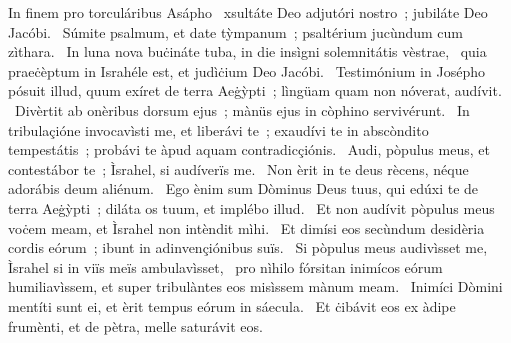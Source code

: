 { In finem pro torculáribus Asápho}
{%
~xsultáte Deo adjutóri nostro~; jubiláte Deo Jacóbi. 
~Súmite psalmum, et date tỳmpanum~; psaltérium jucùndum cum zìthara. 
~In luna nova buċináte tuba, in die insìgni solemnitátis vèstrae, 
~quia praeċèptum in Israhéle est, et judìċium Deo Jacóbi. 
~Testimónium in Josépho pósuit illud, quum exíret de terra Aeġỳpti~; lìngüam quam non nóverat, audívit. 
~Divèrtit ab onèribus dorsum ejus~; mànüs ejus in còphino servivérunt. 
~In tribulaçióne invocavìsti me, et liberávi te~; exaudívi te in abscòndito tempestátis~; probávi te àpud aquam contradicçiónis. 
~Audi, pòpulus meus, et contestábor te~; Ìsrahel, si audíverïs me. 
~Non èrit in te deus rècens, néque adorábis deum aliénum. 
~Ego ènim sum Dòminus Deus tuus, qui edúxi te de terra Aeġỳpti~; diláta os tuum, et implébo illud. 
~Et non audívit pòpulus meus voċem meam, et Ìsrahel non intèndit mìhi. 
~Et dimísi eos secùndum desidèria cordis eórum~; ibunt in adinvençiónibus suïs. 
~Si pòpulus meus audivìsset me, Ìsrahel si in viïs meïs ambulavìsset, 
~pro nìhilo fórsitan inimícos eórum humiliavìssem, et super tribulàntes eos misìssem mànum meam. 
~Inimíci Dòmini mentíti sunt ei, et èrit tempus eórum in sáecula. 
~Et ċibávit eos ex àdipe frumènti, et de pètra, melle saturávit eos. 
}
